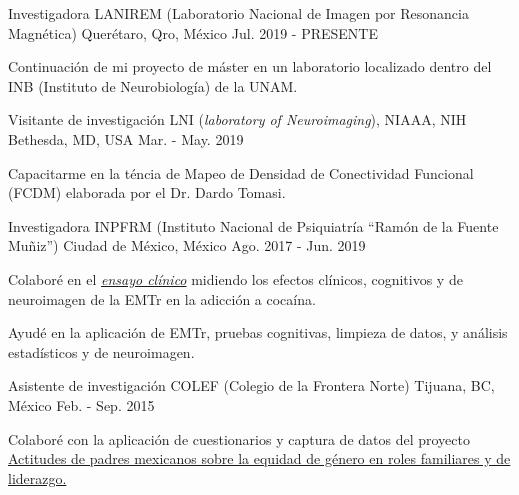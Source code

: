 \vspace{-3.2mm}
\vspace{-1.5mm}
\begin{cventries}
    \cventry
        {Investigadora}
        {LANIREM (Laboratorio Nacional de Imagen por Resonancia Magnética)}
        {Querétaro, Qro, México}
        {Jul. 2019 - PRESENTE}
        {
            \begin{cvitems}
                \item {Continuación de mi proyecto de máster en un laboratorio localizado dentro del INB (Instituto de Neurobiología) de la UNAM.}
            \end{cvitems}
        }
    \cventry
        {Visitante de investigación}
        {LNI (\textit{laboratory of Neuroimaging}), NIAAA, NIH}
        {Bethesda, MD, USA}
        {Mar. - May. 2019}
        {
            \begin{cvitems}
                \item {Capacitarme en la téncia de Mapeo de Densidad de Conectividad Funcional (FCDM) elaborada por el Dr. Dardo Tomasi.}
            \end{cvitems}
        }
    \cventry
        {Investigadora}
        {INPFRM (Instituto Nacional de Psiquiatría ``Ramón de la Fuente Muñiz'')}
        {Ciudad de México, México}
        {Ago. 2017 - Jun. 2019}
        {
            \begin{cvitems}
            \item {Colaboré en el \href{https://clinicaltrials.gov/ct2/show/study/NCT02986438?term=Jorge+Gonzalez-Olvera&cntry=MX&rank=2}{\textit{ensayo clínico}} midiendo los efectos clínicos, cognitivos y de neuroimagen de la EMTr en la adicción a cocaína.}
            \item {Ayudé en la aplicación de EMTr, pruebas cognitivas, limpieza de datos, y análisis estadísticos y de neuroimagen.}
            \end{cvitems}
        }
        \cventry
        {Asistente de investigación}
        {COLEF (Colegio de la Frontera Norte)}
        {Tijuana, BC, México}
        {Feb. - Sep. 2015}
        {
            \begin{cvitems}
            \item {Colaboré con la aplicación de cuestionarios y captura de datos del proyecto \href{https://estudiosdemograficosyurbanos.colmex.mx/index.php/edu/article/view/1791/pdf}{Actitudes de padres mexicanos sobre la equidad de género en roles familiares y de liderazgo.}}
            \end{cvitems}
        }
\end{cventries}
